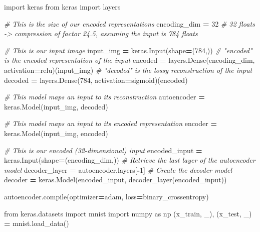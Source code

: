 \documentclass[
  a4paper,
  DIV=11,
  numbers=noendperiod]{scrreprt}
\newenvironment{Shaded}{\begin{snugshade}}{\end{snugshade}}
\newcommand{\BuiltInTok}[1]{#1}
\newcommand{\CommentTok}[1]{\textcolor[rgb]{0.56,0.35,0.01}{\textit{#1}}}
\newcommand{\DecValTok}[1]{\textcolor[rgb]{0.00,0.00,0.81}{#1}}
\newcommand{\ImportTok}[1]{#1}
\newcommand{\NormalTok}[1]{#1}
\newcommand{\OperatorTok}[1]{\textcolor[rgb]{0.81,0.36,0.00}{\textbf{#1}}}
\newcommand{\StringTok}[1]{\textcolor[rgb]{0.31,0.60,0.02}{#1}}
\begin{document}
\begin{Shaded}
\begin{Highlighting}[numbers=left,,]

\ImportTok{import}\NormalTok{ keras}
\ImportTok{from}\NormalTok{ keras }\ImportTok{import}\NormalTok{ layers}

\CommentTok{\# This is the size of our encoded representations}
\NormalTok{encoding\_dim }\OperatorTok{=} \DecValTok{32}  \CommentTok{\# 32 floats {-}\textgreater{} compression of factor 24.5, assuming the input is 784 floats}

\CommentTok{\# This is our input image}
\NormalTok{input\_img }\OperatorTok{=}\NormalTok{ keras.Input(shape}\OperatorTok{=}\NormalTok{(}\DecValTok{784}\NormalTok{,))}
\CommentTok{\# "encoded" is the encoded representation of the input}
\NormalTok{encoded }\OperatorTok{=}\NormalTok{ layers.Dense(encoding\_dim, activation}\OperatorTok{=}\StringTok{\textquotesingle{}relu\textquotesingle{}}\NormalTok{)(input\_img)}
\CommentTok{\# "decoded" is the lossy reconstruction of the input}
\NormalTok{decoded }\OperatorTok{=}\NormalTok{ layers.Dense(}\DecValTok{784}\NormalTok{, activation}\OperatorTok{=}\StringTok{\textquotesingle{}sigmoid\textquotesingle{}}\NormalTok{)(encoded)}

\CommentTok{\# This model maps an input to its reconstruction}
\NormalTok{autoencoder }\OperatorTok{=}\NormalTok{ keras.Model(input\_img, decoded)}

\CommentTok{\# This model maps an input to its encoded representation}
\NormalTok{encoder }\OperatorTok{=}\NormalTok{ keras.Model(input\_img, encoded)}

\CommentTok{\# This is our encoded (32{-}dimensional) input}
\NormalTok{encoded\_input }\OperatorTok{=}\NormalTok{ keras.Input(shape}\OperatorTok{=}\NormalTok{(encoding\_dim,))}
\CommentTok{\# Retrieve the last layer of the autoencoder model}
\NormalTok{decoder\_layer }\OperatorTok{=}\NormalTok{ autoencoder.layers[}\OperatorTok{{-}}\DecValTok{1}\NormalTok{]}
\CommentTok{\# Create the decoder model}
\NormalTok{decoder }\OperatorTok{=}\NormalTok{ keras.Model(encoded\_input, decoder\_layer(encoded\_input))}

\NormalTok{autoencoder.}\BuiltInTok{compile}\NormalTok{(optimizer}\OperatorTok{=}\StringTok{\textquotesingle{}adam\textquotesingle{}}\NormalTok{, loss}\OperatorTok{=}\StringTok{\textquotesingle{}binary\_crossentropy\textquotesingle{}}\NormalTok{)}

\ImportTok{from}\NormalTok{ keras.datasets }\ImportTok{import}\NormalTok{ mnist}
\ImportTok{import}\NormalTok{ numpy }\ImportTok{as}\NormalTok{ np}
\NormalTok{(x\_train, \_), (x\_test, \_) }\OperatorTok{=}\NormalTok{ mnist.load\_data()}


\end{Highlighting}
\end{Shaded}
\end{document}
